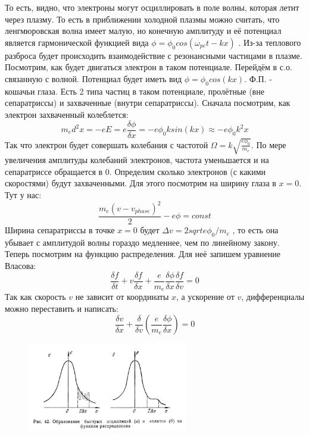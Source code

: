 \documentclass[10pt, a4paper]{article}
\begin{document}
То есть, видно, что электроны могут осциллировать в поле волны, которая летит через плазму. То есть в приближении холодной плазмы можно считать, что ленгмюровская волна имеет малую, но конечную амплитуду и её потенциал является гармонической функцией вида $\phi = \phi_0 cos(\omega_{pe} t -kx)$ .  Из-за теплового разброса будет происходить взаимодействие с резонансными частицами в плазме. Посмотрим, как будет двигаться электрон в таком потенциале. Перейдём в с.о. связанную с волной. Потенциал будет иметь вид $\phi = \phi_0 cos(kx)$. Ф.П. - кошачьи глаза. Есть 2 типа частиц в таком потенциале, пролётные (вне сепаратриссы) и захваченные (внутри сепаратриссы).
Сначала посмотрим, как электрон захваченный колеблется:
\begin{equation}
	m_e d^2 x=-eE=e \frac{\delta \phi}{\delta x}=-e \phi_0 k  sin(kx) \approx -e \phi_0 k^2 x
\end{equation}
Так что электрон будет совершать колебания с частотой $\Omega =k\sqrt{\frac{e \phi_0}{m_e}}$. По мере увеличения амплитуды колебаний электронов, частота уменьшается и на сепаратриссе обращается в 0. Определим сколько электронов (с какими скоростями) будут захваченными. Для этого посмотрим на ширину глаза в $x=0$. Тут у нас:
\begin{equation}
	\frac{m_e (v-v_{phase})^2}{2} - e \phi =const
\end{equation}
Ширина сепаратриссы в точке $x=0$ будет $\Delta v= 2 sqrt{e \phi_0 / m_e}$ , то есть она убывает с амплитудой волны гораздо медленнее, чем по линейному закону. 
Теперь посмотрим на функцию распределения. Для неё запишем уравнение Власова:
\begin{equation}
	\frac{\delta f}{\delta t} + v \frac{\delta f}{\delta x} + \frac{e}{m_e} \frac{\delta \phi}{\delta x} \frac{\delta f}{\delta v} =0 
\end{equation}
Так как скорость $v$ не зависит от координаты $x$, а ускорение от $v$, дифференциалы можно переставить и написать:
\begin{equation}
	\frac{\delta v}{\delta x} +\frac{\delta}{\delta v} (\frac{e}{m_e} \frac{\delta \phi}{\delta x} )=0
\end{equation}

\begin{figure}[h!]
	\begin{center}
		\includegraphics[width=70mm]{zatuh_landau_nonlinear_2.JPG}
	\end{center}
\end{figure}
\end{document}

